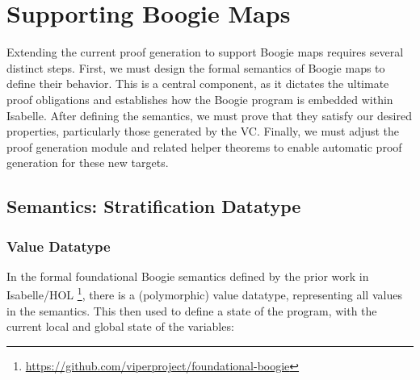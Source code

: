 \chapter{Supporting Boogie Maps}
\label{sec:support-boogie-maps}

Extending the current proof generation to support Boogie maps requires several distinct steps.
First, we must design the formal semantics of Boogie maps to define their behavior.
This is a central component, as it dictates the ultimate proof obligations and establishes how the Boogie program is embedded within Isabelle.
After defining the semantics, we must prove that they satisfy our desired properties, particularly those generated by the VC.
Finally, we must adjust the proof generation module and related helper theorems to enable automatic proof generation for these new targets.


\section{Semantics: Stratification Datatype}

\subsection{Value Datatype}
\label{sec:where-to-start}

In the formal foundational Boogie semantics defined by the prior work in Isabelle/HOL
\footnote{\url{https://github.com/viperproject/foundational-boogie}},
there is a (polymorphic) value datatype, representing all values in the semantics.
This then used to define a state of the program,
with the current local and global state of the variables:


